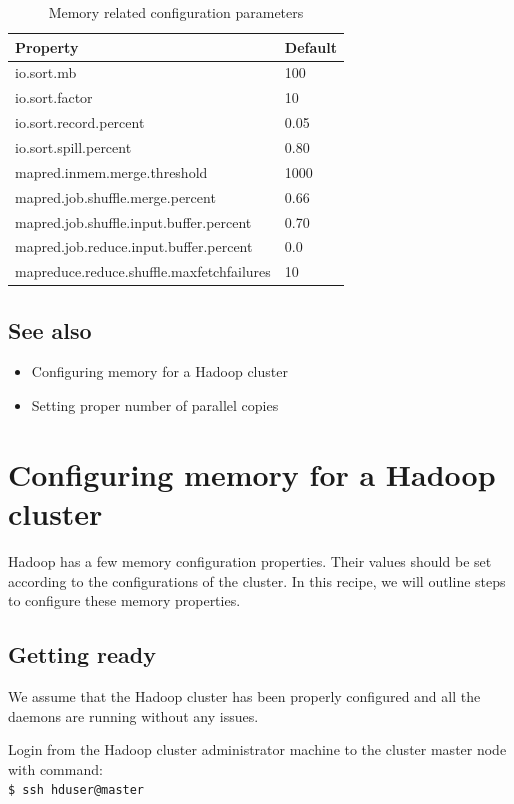 \begin{table}[ht]
  \centering
  \begin{tabular}{ll}
    \toprule
    \textbf{Property} &  \textbf{Default} \\ \midrule
      io.sort.mb & 100 \\
      io.sort.factor & 10 \\
      io.sort.record.percent & 0.05 \\
      io.sort.spill.percent & 0.80 \\
      mapred.inmem.merge.threshold & 1000 \\
      mapred.job.shuffle.merge.percent & 0.66 \\
      mapred.job.shuffle.input.buffer.percent & 0.70 \\
      mapred.job.reduce.input.buffer.percent & 0.0 \\
      mapreduce.reduce.shuffle.maxfetchfailures & 10  \\ \bottomrule
  \end{tabular}
  \caption{Memory related configuration parameters}\label{tbl:memoryconfig}
\end{table}

\subsection*{See also}
\begin{itemize}
  \item Configuring memory for a Hadoop cluster
  \item Setting proper number of parallel copies
\end{itemize}
\section{Configuring memory for a Hadoop cluster}
Hadoop has a few memory configuration properties. Their values should be set according to the configurations of the cluster. In this recipe, we will outline steps to configure these memory properties.
\subsection*{Getting ready}
We assume that the Hadoop cluster has been properly configured and all the daemons are running without any issues.

Login from the Hadoop cluster administrator machine to the cluster master node with command: \\
\verb|$ ssh hduser@master|

